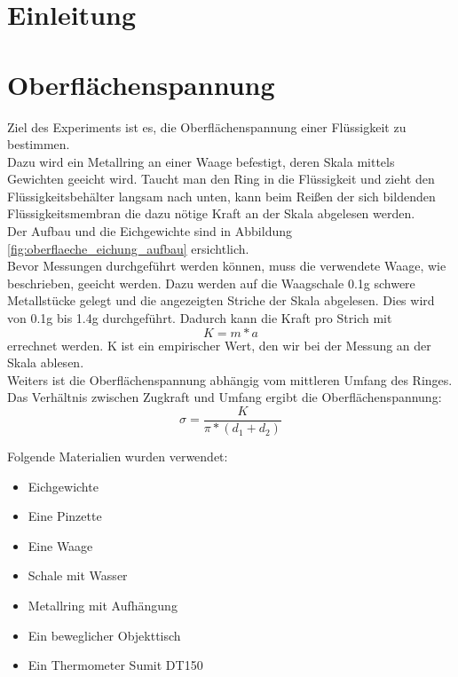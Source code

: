 \documentclass[12pt,a4paper]{article}
\begin{document}
\pagebreak
\setlength{\columnsep}{20pt}
\begin{multicols}{2}
\section{Einleitung}

\section{Oberflächenspannung}
Ziel des Experiments ist es, die Oberflächenspannung einer Flüssigkeit zu bestimmen. \\
Dazu wird ein Metallring an einer Waage befestigt, deren Skala mittels Gewichten geeicht wird. Taucht man den Ring in die Flüssigkeit und zieht den Flüssigkeitsbehälter langsam nach unten, kann beim Reißen der sich bildenden Flüssigkeitsmembran die dazu nötige Kraft an der Skala abgelesen werden.\\
Der Aufbau und die Eichgewichte sind in Abbildung \ref{fig:oberflaeche_eichung_aufbau} ersichtlich.\\




\noindent
Bevor Messungen durchgeführt werden können, muss die verwendete Waage, wie beschrieben, geeicht werden. Dazu werden auf die Waagschale 0.1g schwere Metallstücke gelegt und die angezeigten Striche der Skala abgelesen. Dies wird von 0.1g bis 1.4g durchgeführt. Dadurch kann die Kraft pro Strich mit
$$K = m * a$$
errechnet werden. K ist ein empirischer Wert, den wir bei der Messung an der Skala ablesen.\\
Weiters ist die Oberflächenspannung abhängig vom mittleren Umfang des Ringes. Das Verhältnis zwischen Zugkraft und Umfang ergibt die Oberflächenspannung:
$$\sigma = \frac{K}{\pi * (d_1 + d_2)}$$

\noindent
Folgende Materialien wurden verwendet:
\begin{itemize}
	\item Eichgewichte
	\item Eine Pinzette
	\item Eine Waage
	\item Schale mit Wasser
	\item Metallring mit Aufhängung
	\item Ein beweglicher Objekttisch
	\item Ein Thermometer Sumit DT150
\end{itemize}


\end{multicols}
\end{document}
